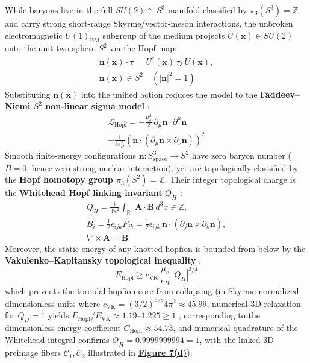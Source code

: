 \documentclass[10pt,aps,prd,twocolumn,superscriptaddress,nofootinbib,floatfix,longbibliography,showkeys]{revtex4-2}
\begin{document}
While baryons live in the full $SU(2) \cong S^3$ manifold classified by $\pi_3(S^3) = \mathbb{Z}$ and carry strong short-range Skyrme/vector-meson interactions, the unbroken electromagnetic $U(1)_{\text{EM}}$ subgroup of the medium projects $U(\mathbf{x}) \in SU(2)$ onto the unit two-sphere $S^2$ via the Hopf map:
\begin{equation}\begin{gathered}
\mathbf{n}(\mathbf{x})\cdot\boldsymbol{\tau} = U^\dagger(\mathbf{x})\,\tau_3\,U(\mathbf{x}), \\
\mathbf{n}(\mathbf{x}) \in S^2 \quad (|\mathbf{n}|^2 = 1)
\end{gathered}\end{equation}
Substituting $\mathbf{n}(\mathbf{x})$ into the unified action reduces the model to the \textbf{Faddeev--Niemi $S^2$ non-linear sigma model} \cite{ref39,ref40,ref41,ref42}:
\begin{multline}
\mathcal{L}_{\text{Hopf}} = -\frac{\mu_e^2}{2}\,\partial_\mu \mathbf{n}\cdot\partial^\mu \mathbf{n} \\
- \frac{1}{4 e_H^2}\left(\mathbf{n}\cdot(\partial_\mu \mathbf{n} \times \partial_\nu \mathbf{n})\right)^2
\end{multline}
Smooth finite-energy configurations $\mathbf{n}: S^3_{\text{space}} \to S^2$ have zero baryon number ($B = 0$, hence zero strong nuclear interaction), yet are topologically classified by the \textbf{Hopf homotopy group $\pi_3(S^2) = \mathbb{Z}$}. Their integer topological charge is the \textbf{Whitehead Hopf linking invariant} $Q_H$ \cite{ref38}:
\begin{equation}\begin{gathered}
Q_H = \frac{1}{4\pi^2}\int_{\mathbb{R}^3} \mathbf{A}\cdot\mathbf{B}\,d^3x \in \mathbb{Z}, \\
B_i = \frac{1}{2}\epsilon_{ijk} F_{jk} = \frac{1}{2}\epsilon_{ijk}\,\mathbf{n}\cdot(\partial_j \mathbf{n} \times \partial_k \mathbf{n}), \\
\nabla\times\mathbf{A} = \mathbf{B}
\end{gathered}\end{equation}
Moreover, the static energy of any knotted hopfion is bounded from below by the \textbf{Vakulenko--Kapitansky topological inequality} \cite{ref39,ref40,ref41,ref42}:
\begin{equation}
E_{\text{Hopf}} \ge c_{\text{VK}}\,\frac{\mu_e}{e_H}\,|Q_H|^{3/4}
\end{equation}
which prevents the toroidal hopfion core from collapsing (in Skyrme-normalized dimensionless units where $c_{\text{VK}} = (3/2)^{3/8} 4\pi^2 \approx 45.99$, numerical 3D relaxation for $Q_H = 1$ yields $E_{\text{Hopf}}/E_{\text{VK}} \approx 1.19\text{--}1.225 \ge 1$ \cite{ref39,ref40,ref41,ref42,ref44,ref45,ref46}, corresponding to the dimensionless energy coefficient $C_{\text{Hopf}} \approx 54.73$, and numerical quadrature of the Whitehead integral confirms $Q_H = 0.9999999994 = 1$, with the linked 3D preimage fibers $\mathcal{C}_1, \mathcal{C}_2$ illustrated in \textbf{\hyperref[fig:fig7]{Figure 7(d)}}).
\end{document}
